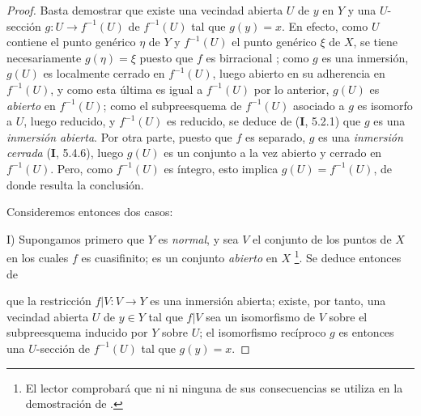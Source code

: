 \begin{proof}
Basta demostrar que existe una vecindad abierta $U$ de $y$ en
$Y$ y una $U$-sección $g:U\to f^{-1}(U)$ de $f^{-1}(U)$ tal que
$g(y)=x$. En efecto, como $U$ contiene el punto genérico $\eta$ de
$Y$ y $f^{-1}(U)$ el punto genérico $\xi$ de $X$, se tiene
necesariamente $g(\eta)=\xi$ puesto que $f$ es birracional
{}; como $g$ es una
inmersión, $g(U)$ es localmente cerrado en $f^{-1}(U)$, luego abierto
en su adherencia en $f^{-1}(U)$, y como esta última es igual
a $f^{-1}(U)$ por lo anterior, $g(U)$ es \emph{abierto} en
$f^{-1}(U)$; como el subpreesquema de $f^{-1}(U)$ asociado a $g$ es
isomorfo a $U$, luego reducido, y $f^{-1}(U)$ es reducido, se deduce
de (\textbf I, 5.2.1) que $g$ es una \emph{inmersión abierta}. Por otra parte, puesto que
$f$ es separado, $g$ es una \emph{inmersión cerrada} (\textbf I, 5.4.6), luego $g(U)$
es un conjunto a la vez abierto y cerrado en $f^{-1}(U)$. Pero, como
$f^{-1}(U)$ es íntegro, esto implica $g(U)=f^{-1}(U)$, de donde resulta la
conclusión.

Consideremos entonces dos casos:

\textup{I)} Supongamos primero que $Y$ es \emph{normal}, y sea $V$ el conjunto de los
puntos de $X$ en los cuales $f$ es cuasifinito; es un conjunto \emph{abierto}
en $X$ {}\footnote{El
lector comprobará que ni {}
ni ninguna de sus consecuencias se utiliza en la demostración de
{}.}. Se deduce entonces de
{}

que la restricción $f|V:V\to Y$ es una inmersión abierta; existe, por tanto,
una vecindad abierta $U$ de $y\in Y$ tal que $f|V$ sea un isomorfismo
de $V$ sobre el subpreesquema inducido por $Y$ sobre $U$; el isomorfismo
recíproco $g$ es entonces una $U$-sección de $f^{-1}(U)$ tal que
$g(y)=x$.


\end{proof}
